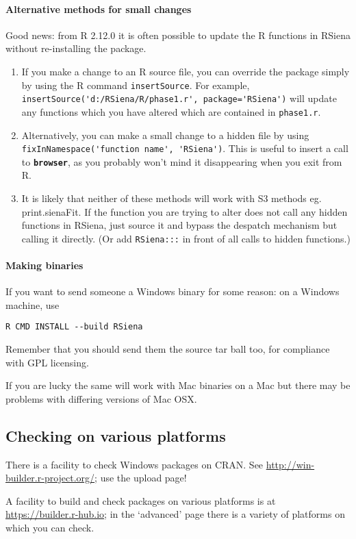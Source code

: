 \documentclass[12pt, a4paper]{article}
\renewcommand{\=}{\,=\,}
\newcommand{\+}{\,+\,}
\newcommand{\sfn}[1]{\textbf{\texttt{#1}}}
\begin{document}
\paragraph{Alternative methods for small changes}
Good news: from R 2.12.0 it is often possible to update the R functions in
RSiena without re-installing the
package.
\begin{enumerate}
\item If you make a change to an R source file, you can override the package
  simply by using the R command \verb|insertSource|. For example,
  \verb|insertSource('d:/RSiena/R/phase1.r', package='RSiena')| will update any
  functions which you have altered which are contained in \verb|phase1.r|.
\item Alternatively, you can make a small change to a hidden file by using
  \verb|fixInNamespace('function name', 'RSiena')|.  This is useful to insert a
  call to \sfn{browser}, as you probably won't mind it disappearing when you
  exit from R.
\item It is likely that neither of these methods will work with S3 methods
  eg. print.sienaFit. If the function you are trying to alter does not call any
  hidden functions in RSiena, just source it and bypass the despatch mechanism
  but calling it directly. (Or add \verb|RSiena:::| in front of all calls to
  hidden functions.)
\end{enumerate}
\paragraph{Making  binaries}
If you want to send someone a Windows binary for some reason: on a Windows
machine, use

\verb|R CMD INSTALL --build RSiena|

Remember that you should send them the source tar ball too, for compliance with
GPL licensing.

If you are lucky the same will work with Mac binaries on a Mac but there may be
problems with differing versions of Mac OSX.

\subsection{Checking on various platforms}
There is a facility to check Windows packages on CRAN. See
\url{http://win-builder.r-project.org/}; use the upload page!

A facility to build and check packages on various platforms
is at \url{https://builder.r-hub.io}; in the `advanced' page
there is a variety of platforms on which you can check.
\end{document}
